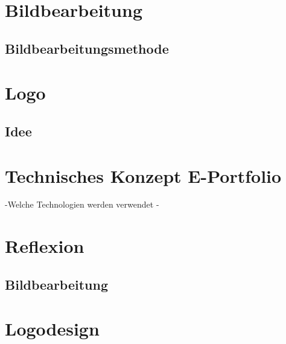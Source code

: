 \documentclass[11pt]{article}
\begin{document}
    \section{Bildbearbeitung}

    \subsection{Bildbearbeitungsmethode}

    \section{Logo}

    \subsection{Idee}

    \section{Technisches Konzept E-Portfolio}
    -Welche Technologien werden verwendet
    -

    \section{Reflexion}

    \subsection{Bildbearbeitung}

    \section{Logodesign}
\end{document}
